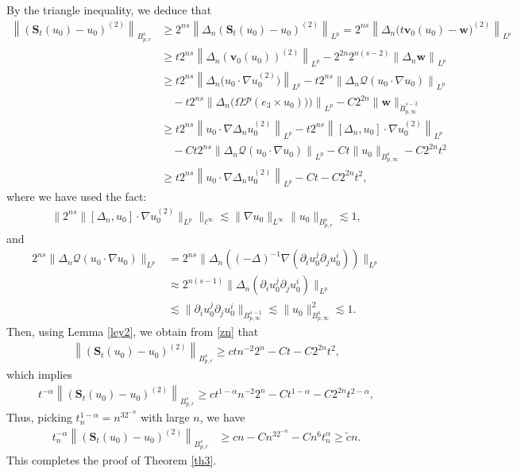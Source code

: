 \documentclass[12pt]{article}
\newcommand{\bal}{\begin{align}}
\newcommand{\bbal}{\begin{align*}}
\newcommand{\pa}{\partial}
\newcommand{\na}{\nabla}
\newcommand{\De}{\Delta}
\newcommand{\cd}{\cdot}
\newcommand{\les}{\lesssim}
\newcommand{\f}{\left}
\newcommand{\g}{\right}
\begin{document}
By the triangle inequality, we deduce that
\bal\label{zn}
\f\|\f(\mathbf{S}_{t}(u_0)-u_0\g)^{(2)}\g\|_{B^{s}_{p,r}}
&\geq2^{{ns}}
\f\|\De_{n}\f(\mathbf{S}_{t}(u_0)-u_0\g)^{(2)}\g\|_{L^p}
=2^{{ns}}\f\|\De_{n}\big(t\mathbf{v}_0(u_0)-\mathbf{w}\big)^{(2)}\g\|_{L^p}
\nonumber\\&\geq t2^{{ns}}\f\|\De_{n}\f(\mathbf{v}_0(u_0)\g)^{(2)}\g\|_{L^p}
-2^{{2n}}2^{{n(s-2)}}
\f\|\De_{n}\mathbf{w}\g\|_{L^p}\nonumber\\
&\geq t2^{{n}s}\f\|\De_{n}\big(u_0\cd\na u_0^{(2)}\big)\g\|_{L^p}-
t2^{{n}s}\f\|\De_{n}\mathcal{Q}(u_0\cd\na u_0)\g\|_{L^p}\nonumber\\
&\quad- t2^{{n}s}\f\|\De_{n}\big(\Omega\mathcal{P}(e_3\times u_0))\big)\g\|_{L^p}-C2^{2{n}}\|\mathbf{w}\|_{\dot{B}^{s-2}_{p,\infty}}
\nonumber\\&\geq t2^{{n}s}\f\|u_0\cd\na\De_{n}u_0^{(2)}\g\|_{L^p}-t2^{ns}\f\|[\De_{n},u_0]\cd\na u_0^{(2)}\g\|_{L^p}\nonumber\\
&\quad-
Ct2^{{n}s}\f\|\De_{n}\mathcal{Q}(u_0\cd\na u_0)\g\|_{L^p}-C t\|u_0\|_{B^{s}_{p,\infty}}-C2^{2n}t^2\nonumber\\
&\geq t2^{ns}\f\|u_0\cd\na \De_{n}u_0^{(2)}\g\|_{L^p}-C t-C2^{2{n}}t^2,
\end{align}
where we have used the fact:
\bbal
\big\|2^{{n}s}\|[\De_{n},u_0]\cd\na u_0^{(2)}\|_{L^p}\big\|_{\ell^\infty}\les \|\na u_0\|_{L^\infty}\|u_0\|_{B^{s}_{p,r}}\les 1,
\end{align*}
and
\bbal
2^{{ns}}\|\De_{n}\mathcal{Q}(u_0\cd\na u_0)\|_{L^p}&= 2^{{ns}}\|\De_{n}((-\Delta)^{-1}\nabla(\pa_iu^j_0\pa_j u_0^i))\|_{L^p}\\
&\approx 2^{{n(s-1)}}\|\De_{n}(\pa_iu^j_0\pa_j u_0^i)\|_{L^p}\\
&\les \|\pa_iu^j_0\pa_j u_0^i\|_{B^{s-1}_{p,\infty}}\les \|u_0\|^2_{B^{s}_{p,\infty}}\les1.
\end{align*}
Then, using Lemma \ref{ley2}, we obtain from \eqref{zn} that
\bbal
\f\|\f(\mathbf{S}_{t}(u_0)-u_0\g)^{(2)}\g\|_{B^{s}_{p,r}}\geq ctn^{-2}2^{n}-Ct-C2^{2{n}}t^2,
\end{align*}
which implies
\bbal
t^{-\alpha}\f\|\f(\mathbf{S}_{t}(u_0)-u_0\g)^{(2)}\g\|_{B^{s}_{p,r}}\geq ct^{1-\alpha}n^{-2}2^{n}-Ct^{1-\alpha}-C2^{2{n}}t^{2-\alpha},
\end{align*}
Thus, picking $t^{1-\alpha}_n=n^32^{-n}$ with large $n$, we have
\bbal
t^{-\alpha}_n\f\|\f(\mathbf{S}_{t}(u_0)-u_0\g)^{(2)}\g\|_{B^{s}_{p,r}}&\geq cn-Cn^32^{-n}-Cn^{6}t_n^{\alpha}
\geq \tilde{c}n.
\end{align*}
This completes the proof of Theorem \ref{th3}.
\end{document}
